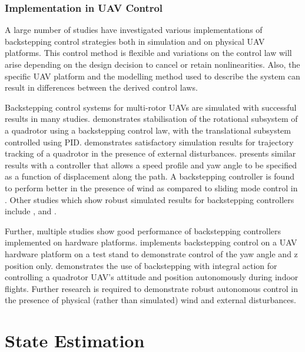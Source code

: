 \subsubsection{Implementation in UAV Control}

A large number of studies have investigated various implementations of backstepping control strategies both in simulation and on physical UAV platforms. This control method is flexible and variations on the control law will arise depending on the design decision to cancel or retain nonlinearities. Also, the specific UAV platform and the modelling method used to describe the system can result in differences between the derived control laws.

Backstepping control systems for multi-rotor UAVs are simulated with successful results in many studies. \cite{Mian2008} demonstrates stabilisation of the rotational subsystem of a quadrotor using a backstepping control law, with the translational subsystem controlled using PID. \cite{ArellanoMuro2013} demonstrates satisfactory simulation results for trajectory tracking of a quadrotor in the presence of external disturbances. \cite{Roza2012} presents similar results with a controller that allows a speed profile and yaw angle to be specified as a function of displacement along the path. A backstepping controller is found to perform better in the presence of wind as compared to sliding mode control in \cite{Moussid2015}. Other studies which show robust simulated results for backstepping controllers include \cite{Madani2006}, \cite{XuanMung2019} and \cite{Shao2018}.

Further, multiple studies show good performance of backstepping controllers implemented on hardware platforms. \cite{Madani2006a} implements backstepping control on a UAV hardware platform on a test stand to demonstrate control of the yaw angle and z position only. \cite{Bouabdallah2006} demonstrates the use of backstepping with integral action for controlling a quadrotor UAV's attitude and position autonomously during indoor flights. Further research is required to demonstrate robust autonomous control in the presence of physical (rather than simulated) wind and external disturbances. 



\section{State Estimation}


